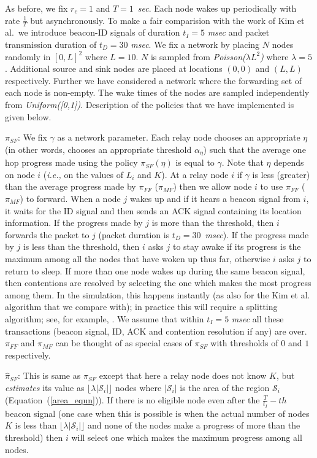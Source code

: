 \documentclass[onecolumn]{IEEEtran}
\begin{document}
As before, we fix $r_c=1$ and $T=1$~\emph{sec}. Each node wakes up
periodically with rate $\frac{1}{T}$ but asynchronously.  To make a
fair comparision with the work of Kim et al.\ we introduce beacon-ID
signals of duration $t_I=5$ \emph{msec} and packet transmission duration of
$t_D=30$ \emph{msec}. We fix a network by placing $N$ nodes randomly in $[0,L]^2$ where $L=10$. $N$ is sampled from
\emph{Poisson($\lambda L^2$)} where $\lambda=5$.  Additional source
and sink nodes are placed at locations $(0,0)$ and $(L,L)$
respectively. Further we have considered a network where the
forwarding set of each node is non-empty.  The wake times of the
nodes are sampled independently from \emph{Uniform([0,1])}. Description of the policies that we have implemented is given below.

\noindent
\emph{$\pi_{SF}$}: We fix $\gamma$ as a network parameter.  Each relay
node chooses an appropriate $\eta$ (in other words, chooses an appropriate threshold 
$\alpha_\eta$) such that the average one hop progress made 
using the policy $\pi_{SF}(\eta)$ is equal to $\gamma$. Note 
that ${\eta}$  depends on node $i$ (\emph{i.e.,} on the values
of $L_i$ and $K$). At a relay node $i$ if $\gamma$ is less (greater) than 
the average progress made by $\pi_{FF}$ ($\pi_{MF}$) then we allow node $i$ to 
use $\pi_{FF}$ ($\pi_{MF}$) to forward. When a node $j$ wakes up and if it hears a beacon signal
from $i$, it waits for the ID signal and then sends an ACK signal containing its location information. 
If the progress made by $j$ is more than the threshold, then $i$ forwards
the packet to $j$ (packet duration is $t_D=30$~\emph{msec}). If the progress
made by $j$ is less than the threshold, then $i$ asks $j$ to stay
awake if its progress is the maximum among all the nodes that have
woken up thus far, otherwise $i$ asks $j$ to return to sleep. If more
than one node wakes up during the same beacon signal, then contentions
are resolved by selecting the one which makes the most progress among
them. In the simulation, this happens instantly (as also for the Kim et al. algorithm that we compare with); in practice this will require a splitting algorithm; see, for example, \cite[Chapter 4.3]{bertsekas-gallager87data-networks}. We assume that within $t_I=5$ \emph{msec} all these transactions
(beacon signal, ID, ACK and contention resolution if any) are over.
$\pi_{FF}$ and $\pi_{MF}$ can be thought of as special cases of
$\pi_{SF}$ with thresholds of $0$ and $1$ respectively.

\noindent
\emph{$\hat{\pi}_{SF}$}: This is same as $\pi_{SF}$ except that here a
relay node does not know $K$, but \emph{estimates} its value as
$\lfloor\lambda|\mathcal{S}_i| \rfloor$ nodes where $|\mathcal{S}_i|$ is the area of the region $\mathcal{S}_i$ (Equation~(\ref{area_equn})). If there is no eligible
node even after the $\frac{T}{t_I}-th$ beacon signal (one case when
this is possible is when the actual number of nodes $K$ is less than
$\lfloor\lambda|\mathcal{S}_i|\rfloor$ and none of the nodes make a
progress of more than the threshold) then $i$ will select one which
makes the maximum progress among all nodes.
\end{document}
